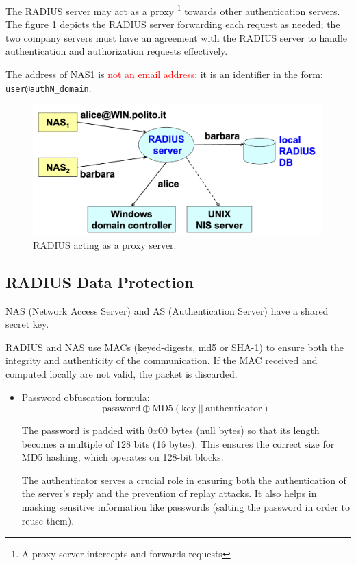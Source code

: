 \begin{multicols}{2}
\raggedcolumns
    The RADIUS server may act as a proxy \footnote{A proxy server intercepts and forwards requests} towards other authentication servers.
    The figure \ref{fig:RADIUS_proxy} depicts the RADIUS server forwarding each request as needed; the two company servers must have an agreement with the RADIUS server to handle authentication and authorization requests effectively.
    
    The address of NAS1 is \textcolor{red}{not an email address}; it is an identifier in the form: \texttt{user@authN\_domain}.
\columnbreak

\begin{figure}[H]
    \centering
    \includegraphics[width=\linewidth]{Images/NetSec/radiusProxy.png}
    \caption{RADIUS acting as a proxy server.}
    \label{fig:RADIUS_proxy}
\end{figure}
\end{multicols}




\subsection*{RADIUS Data Protection}
\begin{center}
    NAS (Network Access Server) and AS (Authentication Server) have a shared secret key.
\end{center}
RADIUS and NAS use MACs (keyed-digests, md5 or SHA-1) to ensure both the integrity and authenticity of the communication. If the MAC received and computed locally are not valid, the packet is discarded.

\begin{itemize}
    \item Password obfuscation formula: 
    \begin{equation*}
        \text{password} \oplus \text{MD5}(\text{key}\ ||\ \text{authenticator})
    \end{equation*}
    
    The password is padded with $0x00$ bytes (null bytes) so that its length becomes a multiple of 128 bits (16 bytes). This ensures the correct size for MD5 hashing, which operates on 128-bit blocks.

    \vspace{0.2cm}

    The authenticator serves a crucial role in ensuring both the authentication of the server's reply and the \underline{prevention of replay attacks}. It also helps in masking sensitive information like passwords (salting the password in order to reuse them).
\end{itemize}



